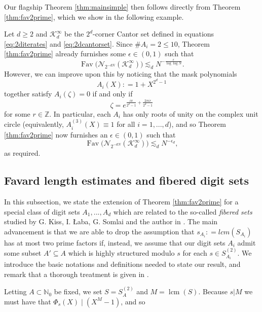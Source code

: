 \documentclass[12pt]{amsart}
\numberwithin{equation}{section}
\DeclareMathOperator{\Fav}{Fav}
\DeclareMathOperator{\lcm}{lcm}
\begin{document}
Our flagship Theorem \ref{thm:mainsimple} then follows directly from Theorem \ref{thm:fav2prime}, which we show in the following example.



\begin{example}\label{examp:highfourcorner}
    \rm{Let $d \geq 2$ and $\mathcal{K}_d^{\infty}$ be the $2^d$-corner Cantor set defined in equations \eqref{eq:2diterates} and \eqref{eq:2dcantorset}. Since $\#A_i = 2 \leq 10$, Theorem \ref{thm:fav2prime} already furnishes some $\epsilon \in (0,1)$ such that
    $$
    \Fav \big(\mathcal{N}_{2^{-dN}} (\mathcal{K}_d^{\infty})\big) \lesssim_d N^{-\frac{\epsilon}{\log \log N}}.
    $$
    However, we can improve upon this by noticing that the mask polynomials
    $$
    A_i (X) : = 1 + X^{2^d -1}
    $$
    together satisfy $A_i(\zeta) = 0$ if and only if
    $$
    \zeta = e^{\frac{i \pi}{2^d-1} + \frac{2 \pi ir}{2^d-1}}
    $$
    for some $r \in \mathbb{Z}$. In particular, each $A_i$ has only roots of unity on the complex unit circle (equivalently, $A_i^{(3)} (X) \equiv 1$ for all $i = 1,...,d$), and so Theorem \ref{thm:fav2prime} now furnishes an $\epsilon \in (0,1)$ such that
    $$
    \Fav \big(\mathcal{N}_{2^{-dN}} (\mathcal{K}_d^{\infty})\big) \lesssim_d N^{-\epsilon_d},
    $$
    as required.
    }
\end{example}

\subsection{Favard length estimates and fibered digit sets}\label{subsec:fiberedfav}
In this subsection, we state the extension of Theorem \ref{thm:fav2prime} for a special class of digit sets $A_1,...,A_d$ which are related to the so-called \textit{fibered sets} studied by G. Kiss, I. {\L}aba, G. Somlai and the author in \cite{KLMS}. The main advancement is that we are able to drop the assumption that $s_{A_i} : = lcm (S_{A_i})$ has at most two prime factors if, instead, we assume that our digit sets $A_i$ admit some subset $A' \subseteq A$ which is highly structured modulo $s$ for each $s \in S_{A_i}^{(2)}$. We introduce the basic notations and definitions needed to state our result, and remark that a thorough treatment is given in \cite{KLMS}.

Letting $A\subset \mathbb{N}_{0}$ be fixed, we set $S = S_A^{(2)}$ and $M=\lcm(S)$. Because $s|M$ we must have that $\Phi_s (X) \mid (X^M-1)$, and so 
\end{document}
